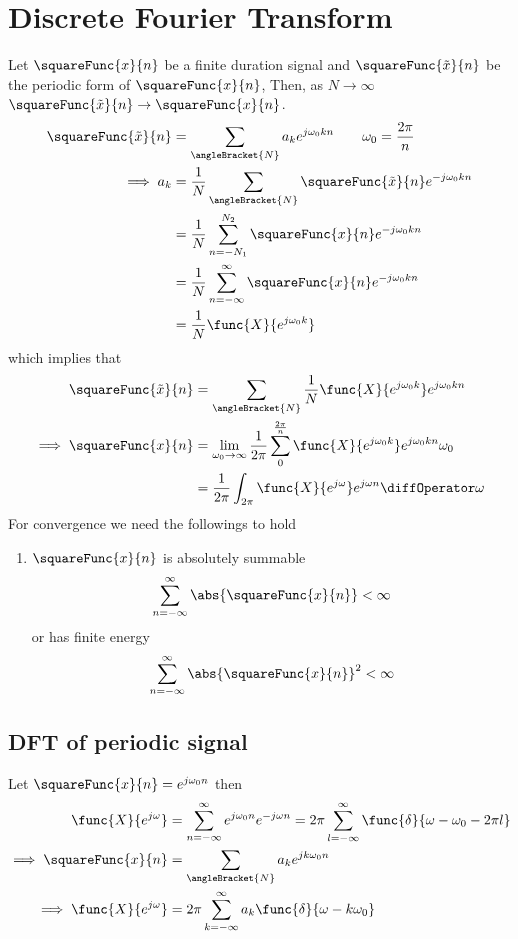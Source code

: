 \chapter{Discrete Fourier Transform}
Let \(\squareFunc{x}{n}\) be a finite duration signal and \(\squareFunc{\tilde{x}}{n}\) be the periodic form of \(\squareFunc{x}{n}\), Then, as \(N \to \infty\) \(\squareFunc{\tilde{x}}{n} \to \squareFunc{x}{n}\). 
\begin{align*}
    \squareFunc{\tilde{x}}{n} &= \sum_{\angleBracket{N}} a_k e^{j\omega_0 kn} \qquad \omega_0 = \dfrac{2\pi}{n} \\
    \implies a_k &= \dfrac{1}{N} \sum_{\angleBracket{N}} \squareFunc{\tilde{x}}{n} e^{-j\omega_0 kn}\\
    &= \dfrac{1}{N} \sum_{n =-N_1}^{N_2} \squareFunc{x}{n} e^{-j\omega_0 kn}\\
    &= \dfrac{1}{N} \sum_{n =-\infty}^{\infty} \squareFunc{x}{n} e^{-j\omega_0 kn} \\
    &= \dfrac{1}{N} \func{X}{e^{j\omega_0 k}} 
\end{align*}
which implies that 
\begin{align*}
    \squareFunc{\tilde{x}}{n} &= \sum_{\angleBracket{N}} \dfrac{1}{N} \func{X}{e^{j\omega_0 k}}  e^{j\omega_0 kn}\\
    \implies \squareFunc{x}{n} &= \lim_{\omega_0 \to \infty} \dfrac{1}{2\pi} \sum_{0}^{\frac{2\pi}{n}} \func{X}{e^{j\omega_0 k}}  e^{j\omega_0 kn} \omega_0\\
    &= \dfrac{1}{2\pi} \int_{2\pi} \func{X}{e^{j\omega}} e^{j\omega n} \diffOperator \omega
\end{align*}
For convergence we need the followings to hold 
\begin{enumerate}
    \item \(\squareFunc{x}{n}\) is absolutely summable 
    \begin{equation*}
        \sum_{n =-\infty}^{\infty} \abs{\squareFunc{x}{n}} < \infty
    \end{equation*}
    or has finite energy 
    \begin{equation*}
        \sum_{n =-\infty}^{\infty} \abs{\squareFunc{x}{n}}^2 < \infty
    \end{equation*}
\end{enumerate}
\section{DFT of periodic signal}
Let \(\squareFunc{x}{n} = e^{j\omega_0 n}\) then 
\begin{align*}
    \func{X}{e^{j\omega}} &= \sum_{n = -\infty}^{\infty} e^{j \omega_0 n} e^{-j \omega n} = 2 \pi \sum_{l = -\infty}^{\infty} \func{\delta}{\omega - \omega_0 - 2\pi l}\\
    \implies \squareFunc{x}{n} &= \sum_{\angleBracket{N}} a_k e^{jk \omega_0 n}\\
    \implies \func{X}{e^{j\omega}} &= 2 \pi \sum_{k = -\infty}^{\infty} a_k \func{\delta}{\omega - k\omega_0}
\end{align*}

